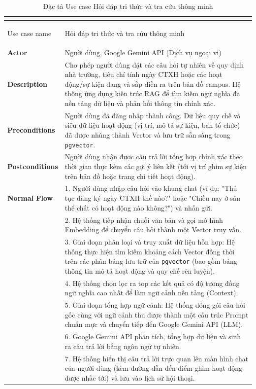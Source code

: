 \renewcommand{\arraystretch}{1.5}
\begin{xltabular}{\textwidth}{|>{\bfseries}p{3.5cm}|X|}
    \caption{Đặc tả Use case Hỏi đáp tri thức và tra cứu thông minh (RAG)} \label{tab:uc_tracuuthongminh} \\
    \hline
    \endfirsthead
    \caption[]{Đặc tả Use case Hỏi đáp tri thức và tra cứu thông minh} \\
    \hline
    \endhead
    \hline
    \endfoot
    \hline
    \endlastfoot

    Use case name & Hỏi đáp tri thức và tra cứu thông minh \\ \hline
    Actor & Người dùng, Google Gemini API (Dịch vụ ngoại vi) \\ \hline
    Description & Cho phép người dùng đặt các câu hỏi tự nhiên về quy định nhà trường, tiêu chí tính ngày CTXH hoặc các hoạt động/sự kiện đang và sắp diễn ra trên bản đồ campus. Hệ thống ứng dụng kiến trúc RAG để tìm kiếm ngữ nghĩa đa nền tảng dữ liệu và phản hồi thông tin chính xác. \\ \hline
    Preconditions & Người dùng đã đăng nhập thành công. Dữ liệu quy chế và siêu dữ liệu hoạt động (vị trí, mô tả sự kiện, ban tổ chức) đã được nhúng thành Vector và lưu trữ sẵn sàng trong \texttt{pgvector}. \\ \hline
    Postconditions & Người dùng nhận được câu trả lời tổng hợp chính xác theo thời gian thực kèm các gợi ý liên kết (tới vị trí ghim sự kiện trên bản đồ hoặc trang chi tiết hoạt động). \\ \hline
    
    \textbf{Normal Flow} & 1. Người dùng nhập câu hỏi vào khung chat (ví dụ: "Thủ tục đăng ký ngày CTXH thế nào?" hoặc "Chiều nay ở sân thể chất có hoạt động nào không?") và nhấn gửi. \\ 
    & 2. Hệ thống tiếp nhận chuỗi văn bản và gọi mô hình Embedding để chuyển câu hỏi thành một Vector truy vấn. \\ 
    & 3. Giai đoạn phân loại và truy xuất dữ liệu hỗn hợp: Hệ thống thực hiện tìm kiếm khoảng cách Vector đồng thời trên các phân bảng lưu trữ của \texttt{pgvector} (bao gồm bảng thông tin mô tả hoạt động và quy chế rèn luyện). \\ 
    & 4. Hệ thống chọn lọc ra top các kết quả có độ tương đồng ngữ nghĩa cao nhất để làm ngữ cảnh nền tảng (Context). \\ 
    & 5. Giai đoạn tổng hợp ngữ cảnh: Hệ thống đóng gói câu hỏi gốc cùng với ngữ cảnh thu được thành một cấu trúc Prompt chuẩn mực và chuyển tiếp đến Google Gemini API (LLM). \\ 
    & 6. Google Gemini API phân tích, tổng hợp dữ liệu và sinh ra câu trả lời bằng ngôn ngữ tự nhiên. \\ 
    & 7. Hệ thống hiển thị câu trả lời trực quan lên màn hình chat của người dùng (kèm đường dẫn đến điểm ghim hoạt động được nhắc tới) và lưu vào lịch sử hội thoại. \\ \hline
    

\end{xltabular}
